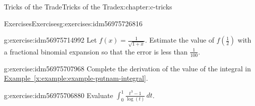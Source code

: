 \documentclass[twoside,10pt,]{book}
\newcommand{\xreffont}{\relax}
\numberwithin{equation}{section}
\begin{document}
\begin{chapterptx}{Tricks of the Trade}{}{Tricks of the Trade}{}{}{x:chapter:c-tricks}
\begin{exercises-section}{Exercises}{}{Exercises}{}{}{g:exercises:idm56975726816}
\begin{divisionexercise}{4}{}{}{g:exercise:idm56975714992}%
Let \(f(x)=\frac{1}{\sqrt{1+x}}\).  Estimate the value of \(f(\frac{1}{2})\) with a fractional binomial expansion so that the error is less than \(\frac{1}{100}\).%
\end{divisionexercise}%
\begin{divisionexercise}{5}{}{}{g:exercise:idm56975707968}%
Complete the derivation of the value of the integral in \hyperref[x:example:example-putnam-integral]{Example~{\xreffont\ref{x:example:example-putnam-integral}}}.%
\end{divisionexercise}%
\begin{divisionexercise}{6}{}{}{g:exercise:idm56975706880}%
Evaluate \(\int_0^1 \frac{t^3-1}{\log (t)} \, dt\).%
\end{divisionexercise}%
\end{exercises-section}
\end{chapterptx}
%
%
\typeout{************************************************}
\typeout{************************************************}
%
\end{document}
